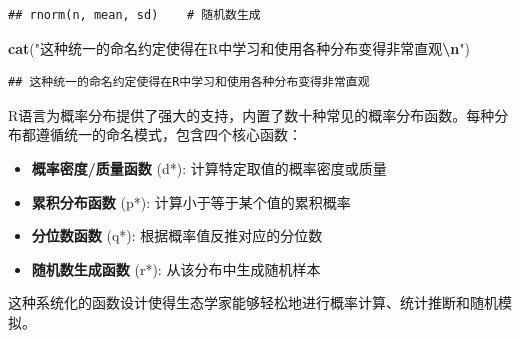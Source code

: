 \documentclass[
  twoside]{book}
\newenvironment{Shaded}{\begin{snugshade}}{\end{snugshade}}
\newcommand{\FunctionTok}[1]{\textcolor[rgb]{0.13,0.29,0.53}{\textbf{#1}}}
\newcommand{\NormalTok}[1]{#1}
\newcommand{\SpecialCharTok}[1]{\textcolor[rgb]{0.81,0.36,0.00}{\textbf{#1}}}
\newcommand{\StringTok}[1]{\textcolor[rgb]{0.31,0.60,0.02}{#1}}
\providecommand{\tightlist}{%
  \setlength{\itemsep}{0pt}\setlength{\parskip}{0pt}}
\begin{document}
\begin{verbatim}
## rnorm(n, mean, sd)    # 随机数生成
\end{verbatim}

\begin{Shaded}
\begin{Highlighting}[]
\FunctionTok{cat}\NormalTok{(}\StringTok{"这种统一的命名约定使得在R中学习和使用各种分布变得非常直观}\SpecialCharTok{\textbackslash{}n}\StringTok{"}\NormalTok{)}
\end{Highlighting}
\end{Shaded}

\begin{verbatim}
## 这种统一的命名约定使得在R中学习和使用各种分布变得非常直观
\end{verbatim}

R语言为概率分布提供了强大的支持，内置了数十种常见的概率分布函数。每种分布都遵循统一的命名模式，包含四个核心函数：

\begin{itemize}
\tightlist
\item
  \textbf{概率密度/质量函数} (d*): 计算特定取值的概率密度或质量
\item
  \textbf{累积分布函数} (p*): 计算小于等于某个值的累积概率
\item
  \textbf{分位数函数} (q*): 根据概率值反推对应的分位数
\item
  \textbf{随机数生成函数} (r*): 从该分布中生成随机样本
\end{itemize}

这种系统化的函数设计使得生态学家能够轻松地进行概率计算、统计推断和随机模拟。
\end{document}
